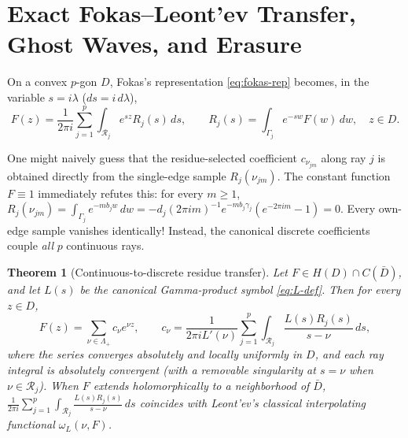 \documentclass[11pt,reqno]{amsart}
\newtheorem{theorem}{Theorem}[section]
\theoremstyle{definition}
\theoremstyle{remark}
\begin{document}
\section{Exact Fokas--Leont'ev Transfer, Ghost Waves, and Erasure}\label{sec:bridge}

On a convex $p$-gon $D$, Fokas's representation \eqref{eq:fokas-rep} becomes, in the variable $s = i\lambda$ ($ds = i\,d\lambda$),
\begin{equation}\label{eq:fokas-s}
  F(z) = \frac{1}{2\pi i} \sum_{j=1}^p \int_{\mathcal{R}_j} e^{sz} R_j(s)\,ds,
  \qquad R_j(s) = \int_{\Gamma_j} e^{-sw} F(w)\,dw, \quad z \in D.
\end{equation}

One might naively guess that the residue-selected coefficient $c_{\nu_{jm}}$ along ray $j$ is obtained directly from the single-edge sample $R_j(\nu_{jm})$. The constant function $F \equiv 1$ immediately refutes this: for every $m \ge 1$, $R_j(\nu_{jm}) = \int_{\Gamma_j} e^{-m b_j w}\,dw = -d_j(2\pi i m)^{-1} e^{-m b_j \gamma_j}(e^{-2\pi i m} - 1) = 0$. Every own-edge sample vanishes identically! Instead, the canonical discrete coefficients couple \emph{all} $p$ continuous rays.

\begin{theorem}[Continuous-to-discrete residue transfer]\label{thm:bridge}
Let $F \in H(D) \cap C(\bar D)$, and let $L(s)$ be the canonical Gamma-product symbol \eqref{eq:L-def}. Then for every $z \in D$,
\begin{equation}\label{eq:transfer}
  F(z) = \sum_{\nu \in \Lambda_+} c_\nu e^{\nu z}, \qquad
  c_\nu = \frac{1}{2\pi i L'(\nu)} \sum_{j=1}^p \int_{\mathcal{R}_j} \frac{L(s) R_j(s)}{s - \nu}\,ds,
\end{equation}
where the series converges absolutely and locally uniformly in $D$, and each ray integral is absolutely convergent (with a removable singularity at $s = \nu$ when $\nu \in \mathcal{R}_j$). When $F$ extends holomorphically to a neighborhood of $\bar D$, $\frac{1}{2\pi i}\sum_{j=1}^p \int_{\mathcal{R}_j} \frac{L(s)R_j(s)}{s-\nu}\,ds$ coincides with Leont'ev's classical interpolating functional $\omega_L(\nu, F)$.
\end{theorem}
\end{document}

